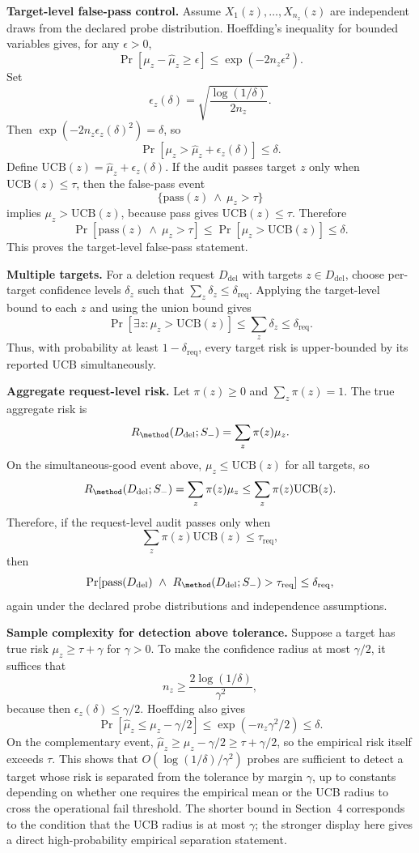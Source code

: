 \textbf{Target-level false-pass control.}
Assume $X_1(z),\ldots,X_{n_z}(z)$ are independent draws from the declared probe distribution. Hoeffding's inequality for bounded variables gives, for any $\epsilon>0$,
\[
\Pr[\mu_z-\hat\mu_z\geq \epsilon]\leq \exp(-2n_z\epsilon^2).
\]
Set
\[
\epsilon_z(\delta)=\sqrt{\frac{\log(1/\delta)}{2n_z}}.
\]
Then $\exp(-2n_z\epsilon_z(\delta)^2)=\delta$, so
\[
\Pr[\mu_z>\hat\mu_z+\epsilon_z(\delta)]\leq\delta.
\]
Define $\mathrm{UCB}(z)=\hat\mu_z+\epsilon_z(\delta)$. If the audit passes target $z$ only when $\mathrm{UCB}(z)\leq\tau$, then the false-pass event
\[
\{\mathrm{pass}(z)\ \wedge\ \mu_z>\tau\}
\]
implies $\mu_z>\mathrm{UCB}(z)$, because pass gives $\mathrm{UCB}(z)\leq\tau$. Therefore
\[
\Pr[\mathrm{pass}(z)\ \wedge\ \mu_z>\tau]
\leq
\Pr[\mu_z>\mathrm{UCB}(z)]
\leq \delta.
\]
This proves the target-level false-pass statement.

\textbf{Multiple targets.}
For a deletion request $D_{\mathrm{del}}$ with targets $z\in D_{\mathrm{del}}$, choose per-target confidence levels $\delta_z$ such that $\sum_z\delta_z\leq\delta_{\mathrm{req}}$. Applying the target-level bound to each $z$ and using the union bound gives
\[
\Pr[\exists z:\mu_z>\mathrm{UCB}(z)]\leq \sum_z\delta_z\leq\delta_{\mathrm{req}}.
\]
Thus, with probability at least $1-\delta_{\mathrm{req}}$, every target risk is upper-bounded by its reported UCB simultaneously.

\textbf{Aggregate request-level risk.}
Let $\pi(z)\geq0$ and $\sum_z\pi(z)=1$. The true aggregate risk is
\[
R_{\method}(D_{\mathrm{del}};S_-)=\sum_z \pi(z)\mu_z.
\]
On the simultaneous-good event above, $\mu_z\leq \mathrm{UCB}(z)$ for all targets, so
\[
R_{\method}(D_{\mathrm{del}};S_-)
=\sum_z\pi(z)\mu_z
\leq
\sum_z\pi(z)\mathrm{UCB}(z).
\]
Therefore, if the request-level audit passes only when
\[
\sum_z\pi(z)\mathrm{UCB}(z)\leq\tau_{\mathrm{req}},
\]
then
\[
\Pr[\mathrm{pass}(D_{\mathrm{del}})\ \wedge\ R_{\method}(D_{\mathrm{del}};S_-)>\tau_{\mathrm{req}}]
\leq \delta_{\mathrm{req}},
\]
again under the declared probe distributions and independence assumptions.

\textbf{Sample complexity for detection above tolerance.}
Suppose a target has true risk $\mu_z\geq\tau+\gamma$ for $\gamma>0$. To make the confidence radius at most $\gamma/2$, it suffices that
\[
n_z\geq \frac{2\log(1/\delta)}{\gamma^2},
\]
because then $\epsilon_z(\delta)\leq \gamma/2$. Hoeffding also gives
\[
\Pr[\hat\mu_z \leq \mu_z-\gamma/2]\leq \exp(-n_z\gamma^2/2)\leq\delta.
\]
On the complementary event, $\hat\mu_z\geq \mu_z-\gamma/2\geq\tau+\gamma/2$, so the empirical risk itself exceeds $\tau$. This shows that $O(\log(1/\delta)/\gamma^2)$ probes are sufficient to detect a target whose risk is separated from the tolerance by margin $\gamma$, up to constants depending on whether one requires the empirical mean or the UCB radius to cross the operational fail threshold. The shorter bound in Section~4 corresponds to the condition that the UCB radius is at most $\gamma$; the stronger display here gives a direct high-probability empirical separation statement.

